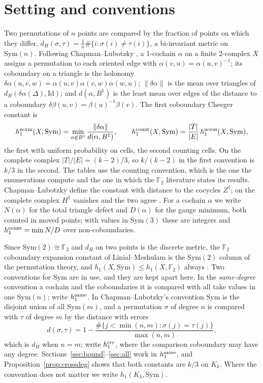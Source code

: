 \documentclass[11pt]{article}
\theoremstyle{remark}\newtheorem{remark}[theorem]{Remark}
\newcommand{\Sym}{\mathrm{Sym}}\newcommand{\dH}{d_H}\newcommand{\F}{\mathbb{F}}\newcommand{\Z}{\mathbb{Z}}
\newcommand{\Id}{\mathrm{Id}}\newcommand{\Tr}{\operatorname{Tr}}
\begin{document}
\begin{abstract}
\end{abstract}

\section{Setting and conventions}
Two permutations of $n$ points are compared by the fraction of points on which they differ,
$\dH(\sigma,\tau)=\tfrac1n\#\{i:\sigma(i)\ne\tau(i)\}$, a bi-invariant metric on $\Sym(n)$. Following Chapman--Lubotzky \cite{CL1,CL2}, a 1-cochain $\alpha$ on a finite 2-complex $X$ assigns a permutation to each oriented edge with $\alpha(v,u)=\alpha(u,v)^{-1}$; its coboundary on a triangle is the holonomy $\delta\alpha(u,v,w)=\alpha(u,v)\alpha(v,w)\alpha(w,u)$; $\|\delta\alpha\|$ is the mean over triangles of $\dH(\delta\alpha(\Delta),\Id)$; and $d(\alpha,B^1)$ is the least mean over edges of the distance to a coboundary $\delta\beta(u,v)=\beta(u)^{-1}\beta(v)$. The first coboundary Cheeger constant is
\[
h_1^{\rm norm}(X,\Sym)=\min_{\alpha\notin B^1}\frac{\|\delta\alpha\|}{d(\alpha,B^1)},\qquad h_1^{\rm count}(X,\Sym)=\frac{|T|}{|E|}\,h_1^{\rm norm}(X,\Sym),
\]
the first with uniform probability on cells, the second counting cells. On the complete complex $|T|/|E|=(k-2)/3$, so $k/(k-2)$ in the first convention is $k/3$ in the second. The tables use the counting convention, which is the one the enumerations compute and the one in which the $\F_2$ literature states its results. Chapman--Lubotzky define the constant with distance to the cocycles $Z^1$; on the complete complex $H^1$ vanishes and the two agree \cite[Cor.~4.1]{CL2}. For a cochain $\alpha$ we write $N(\alpha)$ for the total triangle defect and $D(\alpha)$ for the gauge minimum, both counted in moved points; with values in $\Sym(3)$ these are integers and $h_1^{\rm count}=\min N/D$ over non-coboundaries.

Since $\Sym(2)\cong\F_2$ and $\dH$ on two points is the discrete metric, the $\F_2$ coboundary expansion constant of Linial--Meshulam \cite{LM} is the $\Sym(2)$ column of the permutation theory, and $h_1(X,\Sym)\le h_1(X,\F_2)$ always \cite[footnote 2]{CL2}. Two conventions for $\Sym$ are in use, and they are kept apart here. In the \emph{same-degree} convention a cochain and the coboundaries it is compared with all take values in one $\Sym(n)$; write $h_1^{\rm same}$. In Chapman--Lubotzky's convention $\Sym$ is the disjoint union of all $\Sym(m)$, and a permutation $\sigma$ of degree $n$ is compared with $\tau$ of degree $m$ by the distance with errors
\[
d(\sigma,\tau)=1-\frac{\#\{j<\min(n,m):\sigma(j)=\tau(j)\}}{\max(n,m)},
\]
which is $\dH$ when $n=m$; write $h_1^{\rm err}$, where the comparison coboundary may have any degree. Sections~\ref{sec:bound}--\ref{sec:all} work in $h_1^{\rm same}$, and Proposition~\ref{prop:crossdeg} shows that both constants are $k/3$ on $K_k$. Where the convention does not matter we write $h_1(K_k,\Sym)$.
\end{document}
